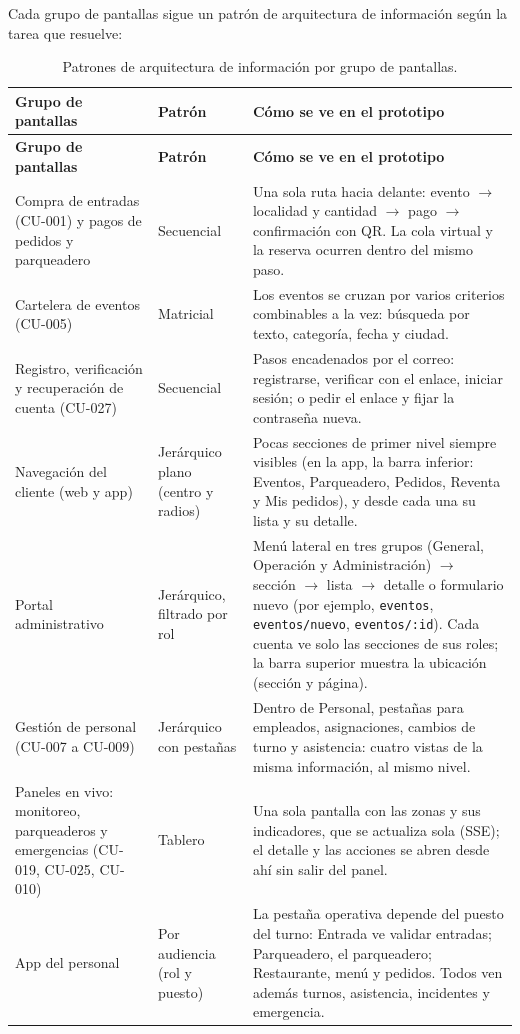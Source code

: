 Cada grupo de pantallas sigue un patrón de arquitectura de información según la tarea que
resuelve:

\begin{center}
\begin{longtable}{|>{\raggedright\arraybackslash}p{3.2cm}|>{\raggedright\arraybackslash}p{2.5cm}|>{\raggedright\arraybackslash}p{7.6cm}|}
\caption{Patrones de arquitectura de información por grupo de pantallas.}\label{tab:arquitectura-informacion}\\
\hline
\textbf{Grupo de pantallas} & \textbf{Patrón} & \textbf{Cómo se ve en el prototipo}\\
\hline
\endfirsthead
\hline
\textbf{Grupo de pantallas} & \textbf{Patrón} & \textbf{Cómo se ve en el prototipo}\\
\hline
\endhead
Compra de entradas (CU-001) y pagos de pedidos y parqueadero & Secuencial &
Una sola ruta hacia delante: evento $\rightarrow$ localidad y cantidad $\rightarrow$ pago
$\rightarrow$ confirmación con QR. La cola virtual y la reserva ocurren dentro del mismo paso.\\
\hline
Cartelera de eventos (CU-005) & Matricial &
Los eventos se cruzan por varios criterios combinables a la vez: búsqueda por texto, categoría,
fecha y ciudad.\\
\hline
Registro, verificación y recuperación de cuenta (CU-027) & Secuencial &
Pasos encadenados por el correo: registrarse, verificar con el enlace, iniciar sesión; o pedir
el enlace y fijar la contraseña nueva.\\
\hline
Navegación del cliente (web y app) & Jerárquico plano (centro y radios) &
Pocas secciones de primer nivel siempre visibles (en la app, la barra inferior: Eventos,
Parqueadero, Pedidos, Reventa y Mis pedidos), y desde cada una su lista y su detalle.\\
\hline
Portal administrativo & Jerárquico, filtrado por rol &
Menú lateral en tres grupos (General, Operación y Administración) $\rightarrow$ sección
$\rightarrow$ lista $\rightarrow$ detalle o formulario nuevo (por ejemplo,
\texttt{eventos}, \texttt{eventos/nuevo}, \texttt{eventos/:id}). Cada cuenta ve solo las
secciones de sus roles; la barra superior muestra la ubicación (sección y página).\\
\hline
Gestión de personal (CU-007 a CU-009) & Jerárquico con pestañas &
Dentro de Personal, pestañas para empleados, asignaciones, cambios de turno y asistencia: cuatro
vistas de la misma información, al mismo nivel.\\
\hline
Paneles en vivo: monitoreo, parqueaderos y emergencias (CU-019, CU-025, CU-010) & Tablero &
Una sola pantalla con las zonas y sus indicadores, que se actualiza sola (SSE); el detalle y las
acciones se abren desde ahí sin salir del panel.\\
\hline
App del personal & Por audiencia (rol y puesto) &
La pestaña operativa depende del puesto del turno: Entrada ve validar entradas; Parqueadero, el
parqueadero; Restaurante, menú y pedidos. Todos ven además turnos, asistencia, incidentes y
emergencia.\\
\hline
\end{longtable}
\end{center}

